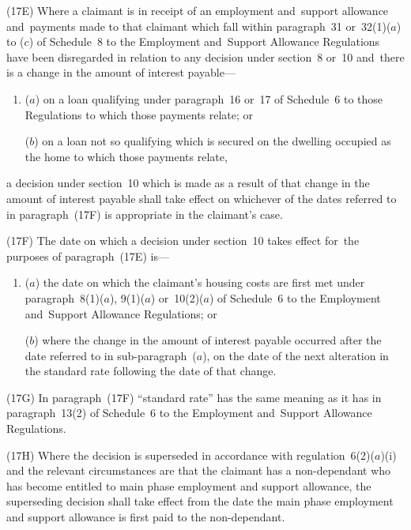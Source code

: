 \documentclass[12pt,a4paper]{article}
\begin{document}
(17E) Where a claimant is in receipt of an employment and~support allowance and~payments made to that claimant which fall within paragraph~31 or~32(1)($a$)  to ($c$)  of Schedule~8 to the Employment and~Support Allowance Regulations have been disregarded in relation to any decision under section~8 or~10 and~there is a change in the amount of interest payable—
\begin{enumerate}\item[]
($a$) on a loan qualifying under paragraph~16 or~17 of Schedule~6 to those Regulations to which those payments relate; or

($b$) on a loan not so qualifying which is secured on the dwelling occupied as the home to which those payments relate,
\end{enumerate}
a decision under section~10 which is made as a result of that change in the amount of interest payable shall take effect on whichever of the dates referred to in paragraph~(17F) is appropriate in the claimant’s case.

(17F) The date on which a decision under section~10 takes effect for~the purposes of paragraph~(17E) is—
\begin{enumerate}\item[]
($a$) the date on which the claimant’s housing costs are first met under paragraph~8(1)($a$), 9(1)($a$)  or~10(2)($a$)  of Schedule~6 to the Employment and~Support Allowance Regulations; or

($b$) where the change in the amount of interest payable occurred after the date referred to in sub-paragraph~($a$), on the date of the next alteration in the standard rate following the date of that change.
\end{enumerate}

(17G) In paragraph~(17F) “standard rate” has the same meaning as it has in paragraph~13(2) of Schedule~6 to the Employment and~Support Allowance Regulations.

\begin{sloppypar}
(17H) Where the decision is superseded in accordance with regulation~6(2)($a$)(i)  and the relevant circumstances are that the claimant has a non-dependant who has become entitled to main phase employment and support allowance, the superseding decision shall take effect from the date the main phase employment and support allowance is first paid to the non-dependant.
\end{sloppypar}
\end{document}
